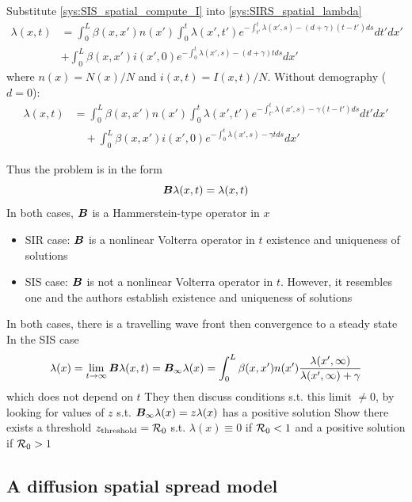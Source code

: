 \documentclass[aspectratio=169]{beamer}\usepackage[]{graphicx}\usepackage[]{xcolor}
\begin{document}
\begin{frame}
Substitute \eqref{sys:SIS_spatial_compute_I} into \eqref{sys:SIRS_spatial_lambda}
\[
\begin{aligned}
\lambda(x,t) &=
\int_0^L \beta(x,x')n(x')
\int_0^t \lambda(x',t')
e^{-\int_{t'}^t \lambda(x',s)-(d+\gamma)(t-t')ds}dt'dx' \\
&+\int_0^L \beta(x,x')i(x',0)
e^{-\int_0^t \lambda(x',s)-(d+\gamma)t ds}dx'
\end{aligned}
\]
where $n(x)=N(x)/N$ and $i(x,t)=I(x,t)/N$. Without demography ($d=0$):
\[
\begin{aligned}
\lambda(x,t) &=
\int_0^L \beta(x,x')n(x')
\int_0^t \lambda(x',t')
e^{-\int_{t'}^t \lambda(x',s)-\gamma(t-t')ds}dt'dx' \\
&\quad +\int_0^L \beta(x,x')i(x',0)
e^{-\int_0^t \lambda(x',s)-\gamma t ds}dx'
\end{aligned}
\]
\end{frame}


\begin{frame}
Thus the problem is in the form
\[
\bm{B}\lambda(x,t)=\lambda(x,t)
\]
\vfill
In both cases, $\bm{B}$ is a Hammerstein-type operator in $x$
\vfill
\begin{itemize}
\item SIR case: $\bm{B}$ is a nonlinear Volterra operator in $t$ \imply existence and uniqueness of solutions
\vfill
\item SIS case: $\bm{B}$ is not a nonlinear Volterra operator in $t$. However, it resembles one and the authors establish existence and uniqueness of solutions
\end{itemize}
\end{frame}


\begin{frame}
In both cases, there is a travelling wave front then convergence to a steady state
\vfill
In the SIS case
\[
\lambda(x)=\lim_{t\to\infty}\bm{B}\lambda(x,t)
=\bm{B}_\infty\lambda(x)=
\int_0^L\beta(x,x')n(x')
\frac{\lambda(x',\infty)}{\lambda(x',\infty)+\gamma}
\]
which does not depend on $t$
\vfill 
They then discuss conditions s.t. this limit $\neq 0$, by looking for values of $z$ s.t. $\bm{B}_\infty\lambda(x)=z\lambda(x)$ has a positive solution
\vfill
Show there exists a threshold $z_{\text{threshold}}=\mathcal{R}_0$ s.t. $\lambda(x)\equiv 0$ if $\mathcal{R}_0<1$ and a positive solution if $\mathcal{R}_0>1$
\end{frame}


\subsection{A diffusion spatial spread model}
\end{document}
